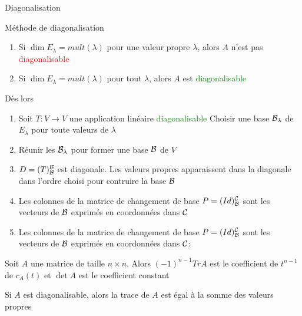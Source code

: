 \begin{parag}{Diagonalisation}
\begin{subparag}{Méthode de diagonalisation}
\begin{enumerate}
            \item Si $\dim E_\lambda = mult(\lambda)$ pour une valeur propre $\lambda$, alors $A$ n'est pas \textcolor{red}{diagonalisable}
            \item Si $\dim E_\lambda = mult(\lambda)$ pour tout $\lambda$, alors $A$ est \textcolor{green}{diagonalisable}
        \end{enumerate}
        Dès lors
        \begin{enumerate}
            \item Soit $T: V \to V$ une application linéaire \textcolor{green}{diagonalisable}
            Choisir une base $\mathcal{B}_\lambda$ de $E_\lambda$ pour toute valeurs de $\lambda$
            \item Réunir les $\mathcal{B}_\lambda$ pour former une base $\mathcal{B}$ de $V$
            \item $D = (T)_{\mathcal{B}}^{\mathcal{B}}$ est diagonale. Les valeurs propres apparaissent dans la diagonale dans l'ordre choisi pour contruire la base $\mathcal{B}$
            \item Les colonnes de la matrice de changement de base $P = (Id)_{\mathcal{B}}^{\mathcal{C}}$ sont les vecteurs de $\mathcal{B}$ exprimés en coordonnées dans $\mathcal{C}$
            \item Les colonnes de la matrice de changement de base $P = (Id)_{\mathcal{B}}^{\mathcal{C}}$ sont les vecteurs de $\mathcal{B}$ exprimés en coordonnées dans $\mathcal{C}$:
        \end{enumerate}
    \end{subparag}
    \begin{truc}
        Soit $A$ une matrice de taille $n \times n$. Alors $(-1)^{n-1}TrA$ est le coefficient de $t^{n-1}$ de $c_A(t)$ et $\det A$ est le coefficient constant
    \end{truc}
    \begin{truc}
        Si $A$ est diagonalisable, alors la trace de $A$ est égal à la somme des valeurs propres
    \end{truc}
\end{parag}


